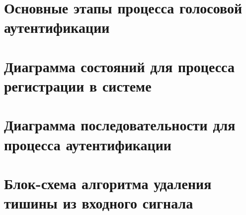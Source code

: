 \documentclass[12pt]{article}
\begin{document}
\section{Основные этапы процесса голосовой аутентификации}

\begin{figure}[h!]
\end{figure}

\section{Диаграмма состояний для процесса регистрации в системе}

\begin{figure}[h!]
\end{figure}

\section{Диаграмма последовательности для процесса аутентификации}
\begin{figure}[hp!]
\end{figure}

\section{Блок-схема алгоритма удаления тишины из входного сигнала}
 
\end{document}
